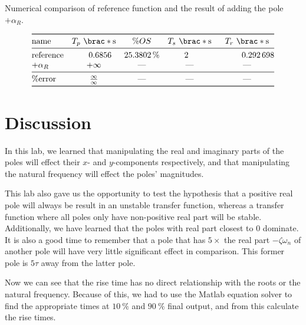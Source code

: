 \documentclass[12pt]{article}
\DeclarePairedDelimiter\brac[]%
\begin{document}
\begin{table}[]
    \centering
    \caption{Numerical comparison of reference function and the result of adding the pole $+\alpha_R$.}
    \[
        \begin{array}{@{}>$l<$*4S@{}}
        \toprule
            name &
            T_p\ \brac*{\si\second}
                & \%OS
                & T_s\ \brac*{\si\second}
                & T_r\ \brac*{\si\second}
        \\*
        \midrule
            reference &
            0.6856 & \SI{25.3802}\percent & 2 & 0.292698
        \\*
            $+\alpha_R$ &
            \text{$+\infty$} & \text{---} & \text{---} & \text{---}
        \\*
        \midrule
            \%error &
            \frac\infty\infty
                & \text{---}
                & \text{---}
                & \text{---}
        \\*
        \bottomrule
        \end{array}
    \]
    \label{tab:positive real poles}
\end{table}

\section{Discussion}

In this lab, we learned that manipulating the real and imaginary parts of the poles will effect their $x$- and $y$-components respectively, and that manipulating the natural frequency will effect the poles' magnitudes.

This lab also gave us the opportunity to test the hypothesis that a positive real pole will always be result in an unstable transfer function, whereas a transfer function where all poles only have non-positive real part will be stable.
Additionally, we have learned that the poles with real part closest to $0$ dominate.
It is also a good time to remember that a pole that has $5\times$ the real part $-\zeta\omega_n$ of another pole
will have very little significant effect in comparison.
This former pole is $5\tau$ away from the latter pole.

Now we can see that the rise time has no direct relationship with the roots or the natural frequency.
Because of this, we had to use the Matlab equation solver to find the appropriate times at $\SI{10}\percent$ and $\SI{90}\percent$ final output,
and from this calculate the rise times.
\end{document}

